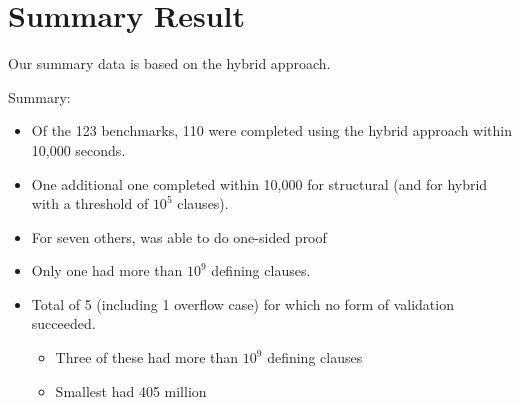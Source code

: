 \documentclass[twoside,11pt]{article}
\begin{document}
\section*{Summary Result}


Our summary data is based on the hybrid approach.

Summary:

\begin{itemize}
\item Of the 123 benchmarks, 110 were completed using the hybrid approach within 10,000 seconds.
\item One additional one completed within 10,000 for structural (and for hybrid with a threshold of $10^5$ clauses).
\item For seven others, was able to do one-sided proof
\item Only one had more than $10^9$ defining clauses.
\item Total of 5 (including 1 overflow case) for which no form of validation succeeded.
  \begin{itemize}
  \item Three of these had more than $10^9$ defining clauses
  \item Smallest had 405 million
  
  \end{itemize}
\end{itemize}
\end{document}
